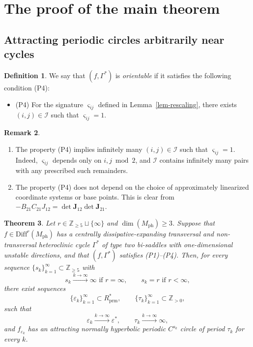 \documentclass[11pt,a4paper]{article}
\theoremstyle{plain}
\newtheorem{theorem}{Theorem}[section]
\theoremstyle{definition}
\newtheorem{definition}[theorem]{Definition}
\newtheorem{remark}[theorem]{Remark}
\theoremstyle{plain}
\numberwithin{equation}{section}
\begin{document}
\section{The proof of the main theorem}
\label{sec-PMT}

\subsection{Attracting periodic circles arbitrarily near cycles}

\begin{definition}
We say that $(f,\Gamma^*)$ is \emph{orientable} if it satisfies the following condition \textup{(P4)}:
\begin{itemize}
\item \textup{(P4)} For the signature $\varsigma_{ij}$ defined in Lemma~\ref{lem-rescaling}, there exists $(i, j) \in \mathcal{I}$ such that $\varsigma_{ij} = 1$.
\end{itemize}
\end{definition}

\begin{remark}\leavevmode
\label{rem-orientable}
\begin{enumerate}
\item[(1)] The property \textup{(P4)} implies infinitely many $(i, j) \in \mathcal{I}$ such that $\varsigma_{ij} = 1$. Indeed, $\varsigma_{ij}$ depends only on $i,j \bmod 2$, and $\mathcal{I}$ contains infinitely many pairs with any prescribed such remainders.
\item[(2)] The property \textup{(P4)} does not depend on the choice of approximately linearized coordinate systems or base points. This is clear from $-B_{21}C_{21}J_{12} = \det \mathbf{J}_{12}\det \mathbf{J}_{21}$.
\end{enumerate}
\end{remark}

\begin{theorem}
\label{thm-circ}
Let $r \in \mathbb{Z}_{\ge 5} \sqcup \{\infty\}$ and $\dim(M_\mathrm{ph}) \ge 3$. Suppose that $f \in \mathrm{Diff}^r(M_\mathrm{ph})$ has a centrally dissipative-expanding transversal and non-transversal heteroclinic cycle $\Gamma^*$ of type two bi-saddles with one-dimensional unstable directions, and that $(f,\Gamma^*)$ satisfies \textup{(P1)}--\textup{(P4)}. Then, for every sequence $\{s_k\}_{k=1}^\infty \subset \mathbb{Z}_{\ge 5}$ with
\[
s_k \xrightarrow{k\to\infty} \infty \text{ if } r = \infty,
\qquad
s_k = r \text{ if } r < \infty,
\]
there exist sequences
\[
\{\varepsilon_k\}_{k=1}^\infty \subset R_\mathrm{prm}^*,
\qquad
\{\tau_k\}_{k=1}^\infty \subset \mathbb{Z}_{>0},
\]
such that
\[
\varepsilon_k \xrightarrow{k\to\infty} \varepsilon^*,
\qquad
\tau_k \xrightarrow{k\to\infty} \infty,
\]
and $f_{\varepsilon_k}$ has an attracting normally hyperbolic periodic $C^{s_k}$ circle of period $\tau_k$ for every $k$.
\end{theorem}
\end{document}
